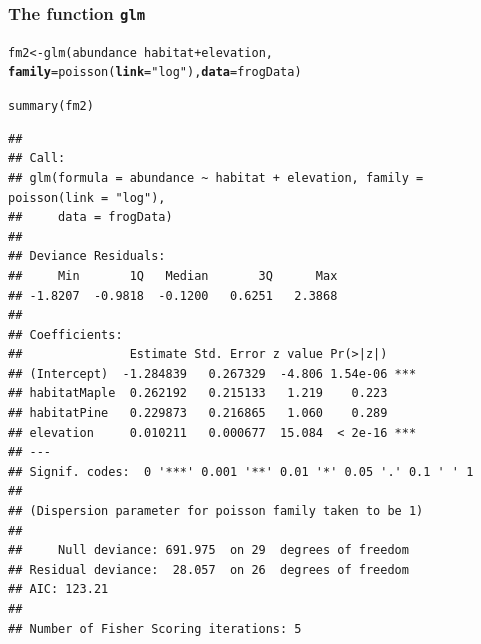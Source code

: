 \documentclass[color=usenames,dvipsnames]{beamer}\usepackage[]{graphicx}\usepackage[]{color}
\makeatletter
\newcommand{\hlstr}[1]{\textcolor[rgb]{0.749,0.012,0.012}{#1}}%
\newcommand{\hlopt}[1]{\textcolor[rgb]{0,0,0}{#1}}%
\newcommand{\hlstd}[1]{\textcolor[rgb]{0,0,0}{#1}}%
\newcommand{\hlkwb}[1]{\textcolor[rgb]{0,0.341,0.682}{#1}}%
\newcommand{\hlkwc}[1]{\textcolor[rgb]{0,0,0}{\textbf{#1}}}%
\newcommand{\hlkwd}[1]{\textcolor[rgb]{0.004,0.004,0.506}{#1}}%
\newenvironment{kframe}{%
 \def\at@end@of@kframe{}%
 \ifinner\ifhmode%
  \def\at@end@of@kframe{\end{minipage}}%
  \begin{minipage}{\columnwidth}%
 \fi\fi%
 \def\FrameCommand##1{\hskip\@totalleftmargin \hskip-\fboxsep
 \colorbox{shadecolor}{##1}\hskip-\fboxsep
     \hskip-\linewidth \hskip-\@totalleftmargin \hskip\columnwidth}%
 \MakeFramed {\advance\hsize-\width
   \@totalleftmargin\z@ \linewidth\hsize
   \@setminipage}}%
 {\par\unskip\endMakeFramed%
 \at@end@of@kframe}
\newenvironment{knitrout}{}{} %
\makeatother
\begin{document}
\begin{frame}[fragile]
  \frametitle{The function {\tt glm}}
  \footnotesize
\begin{knitrout}\tiny
{}\color{fgcolor}\begin{kframe}
\begin{alltt}
\hlstd{fm2} \hlkwb{<-} \hlkwd{glm}\hlstd{(abundance} \hlopt{~} \hlstd{habitat} \hlopt{+} \hlstd{elevation,}
           \hlkwc{family}\hlstd{=}\hlkwd{poisson}\hlstd{(}\hlkwc{link}\hlstd{=}\hlstr{"log"}\hlstd{),} \hlkwc{data}\hlstd{=frogData)}
\end{alltt}
\end{kframe}
\end{knitrout}
\pause
\begin{knitrout}\tiny
{}\color{fgcolor}\begin{kframe}
\begin{alltt}
\hlkwd{summary}\hlstd{(fm2)}
\end{alltt}
\begin{verbatim}
## 
## Call:
## glm(formula = abundance ~ habitat + elevation, family = poisson(link = "log"), 
##     data = frogData)
## 
## Deviance Residuals: 
##     Min       1Q   Median       3Q      Max  
## -1.8207  -0.9818  -0.1200   0.6251   2.3868  
## 
## Coefficients:
##               Estimate Std. Error z value Pr(>|z|)    
## (Intercept)  -1.284839   0.267329  -4.806 1.54e-06 ***
## habitatMaple  0.262192   0.215133   1.219    0.223    
## habitatPine   0.229873   0.216865   1.060    0.289    
## elevation     0.010211   0.000677  15.084  < 2e-16 ***
## ---
## Signif. codes:  0 '***' 0.001 '**' 0.01 '*' 0.05 '.' 0.1 ' ' 1
## 
## (Dispersion parameter for poisson family taken to be 1)
## 
##     Null deviance: 691.975  on 29  degrees of freedom
## Residual deviance:  28.057  on 26  degrees of freedom
## AIC: 123.21
## 
## Number of Fisher Scoring iterations: 5
\end{verbatim}
\end{kframe}
\end{knitrout}
\end{frame}


\end{document}
